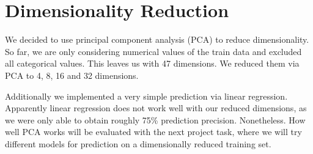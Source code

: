 \section{Dimensionality Reduction}

We decided to use principal component analysis (PCA) to reduce dimensionality. So far, we are only considering numerical values of the train data and excluded all categorical values. This leaves us with 47 dimensions. We reduced them via PCA to 4, 8, 16 and 32 dimensions.

Additionally we implemented a very simple prediction via linear regression. Apparently linear regression does not work well with our reduced dimensions, as we were only able to obtain roughly 75\% prediction precision. Nonetheless. How well PCA works will be evaluated with the next project task, where we will try different models for prediction on a dimensionally reduced training set.